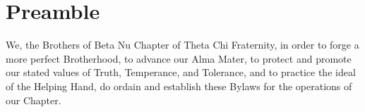 \chapter{Preamble}
	

	
We, the Brothers of Beta Nu Chapter of Theta Chi Fraternity, in order to forge
a more perfect Brotherhood, to advance our Alma Mater, to protect and promote
our stated values of Truth, Temperance, and Tolerance, and to practice the
ideal of the Helping Hand, do ordain and establish these Bylaws for the
operations of our Chapter.

